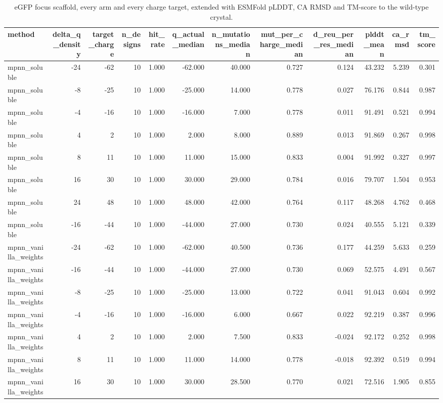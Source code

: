 \begin{table}
\caption{eGFP focus scaffold, every arm and every charge target, extended with ESMFold pLDDT, CA RMSD and TM-score to the wild-type crystal.}
\label{tab:T3_egfp_extended}
\begin{tabular}{lrrrrrrrrrrr}
\toprule
method & delta\_q\_density & target\_charge & n\_designs & hit\_rate & q\_actual\_median & n\_mutations\_median & mut\_per\_charge\_median & d\_reu\_per\_res\_median & plddt\_mean & ca\_rmsd & tm\_score \\
\midrule
mpnn\_soluble & -24 & -62 & 10 & 1.000 & -62.000 & 40.000 & 0.727 & 0.124 & 43.232 & 5.239 & 0.301 \\
mpnn\_soluble & -8 & -25 & 10 & 1.000 & -25.000 & 14.000 & 0.778 & 0.027 & 76.176 & 0.844 & 0.987 \\
mpnn\_soluble & -4 & -16 & 10 & 1.000 & -16.000 & 7.000 & 0.778 & 0.011 & 91.491 & 0.521 & 0.994 \\
mpnn\_soluble & 4 & 2 & 10 & 1.000 & 2.000 & 8.000 & 0.889 & 0.013 & 91.869 & 0.267 & 0.998 \\
mpnn\_soluble & 8 & 11 & 10 & 1.000 & 11.000 & 15.000 & 0.833 & 0.004 & 91.992 & 0.327 & 0.997 \\
mpnn\_soluble & 16 & 30 & 10 & 1.000 & 30.000 & 29.000 & 0.784 & 0.016 & 79.707 & 1.504 & 0.953 \\
mpnn\_soluble & 24 & 48 & 10 & 1.000 & 48.000 & 42.000 & 0.764 & 0.117 & 48.268 & 4.762 & 0.468 \\
mpnn\_soluble & -16 & -44 & 10 & 1.000 & -44.000 & 27.000 & 0.730 & 0.024 & 40.555 & 5.121 & 0.339 \\
mpnn\_vanilla\_weights & -24 & -62 & 10 & 1.000 & -62.000 & 40.500 & 0.736 & 0.177 & 44.259 & 5.633 & 0.259 \\
mpnn\_vanilla\_weights & -16 & -44 & 10 & 1.000 & -44.000 & 27.000 & 0.730 & 0.069 & 52.575 & 4.491 & 0.567 \\
mpnn\_vanilla\_weights & -8 & -25 & 10 & 1.000 & -25.000 & 13.000 & 0.722 & 0.041 & 91.043 & 0.604 & 0.992 \\
mpnn\_vanilla\_weights & -4 & -16 & 10 & 1.000 & -16.000 & 6.000 & 0.667 & 0.022 & 92.219 & 0.387 & 0.996 \\
mpnn\_vanilla\_weights & 4 & 2 & 10 & 1.000 & 2.000 & 7.500 & 0.833 & -0.024 & 92.172 & 0.252 & 0.998 \\
mpnn\_vanilla\_weights & 8 & 11 & 10 & 1.000 & 11.000 & 14.000 & 0.778 & -0.018 & 92.392 & 0.519 & 0.994 \\
mpnn\_vanilla\_weights & 16 & 30 & 10 & 1.000 & 30.000 & 28.500 & 0.770 & 0.021 & 72.516 & 1.905 & 0.855 \\

\end{tabular}
\end{table}

